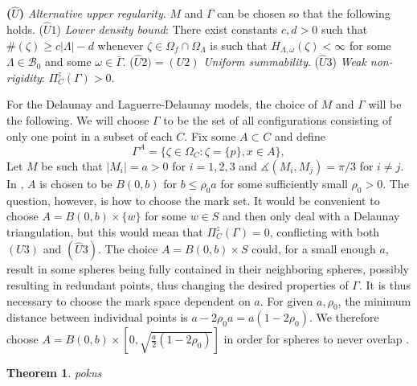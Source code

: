 \documentclass[12pt,a4paper]{report}
\newtheorem{theorem}{Theorem}
\begin{document}

\textbf{($\hat U$)} \textit{Alternative upper regularity}. $M$ and $\Gamma$ can be chosen so that the following holds.\newline
($\hat U 1$) \textit{Lower density bound}: There exist constants $c,d > 0$ such that $\#(\zeta) \geq c|\Lambda| - d$ whenever $\zeta \in \Omega_f\cap \Omega_\Lambda$ is such that $H_{\Lambda,\omega}(\zeta)<\infty$ for some $\Lambda \in \mathcal B_0$ and some $\omega \in \bar\Gamma$.\newline
($\hat U 2 ) = (U2)$ \textit{Uniform summability}.\newline
($\hat U 3$) \textit{Weak non-rigidity}: $\Pi^z_C(\Gamma) > 0$.


For the Delaunay and Laguerre-Delaunay models, the choice of $M$ and $\Gamma$ will be the following. We will choose $\Gamma$ to be the set of all configurations consisting of only one point in a subset of each $C$. Fix some $A \subset C$ and define
$$\Gamma^A = \{\zeta \in \Omega_C: \zeta = \{p\}, x \in A\},$$
Let $M$ be such that $|M_i| = a > 0$ for $i=1,2,3$ and $\measuredangle(M_i,M_j) = \pi / 3$ for $i\neq j$. 
In \cite{DDG}, $A$ is chosen to be $B(0,b)$ for $b\leq \rho_0 a$ for some sufficiently small $\rho_0 >0$. The question, however, is how to choose the mark set. It would be convenient to choose $A=B(0,b)\times\{w\}$ for some $w\in S$ and then only deal with a Delaunay triangulation, but this would mean that $\Pi^z_C(\Gamma) = 0$, conflicting with both $(U3)$ and $(\hat U3)$. The choice $A=B(0,b)\times S$ could, for a small enough $a$, result in some spheres being fully contained in their neighboring spheres, possibly resulting in redundant points, thus changing the desired properties of $\Gamma$. It is thus necessary to choose the mark space dependent on $a$. For given $a,\rho_0$, the minimum distance between individual points is $a-2\rho_0 a = a(1-2\rho_0)$. We therefore choose $A = B(0,b)\times [0, \sqrt{\frac a2(1-2\rho_0)}]$ in order for spheres to never overlap .  







\cite{lamport94}




\begin{theorem}
	pokus
\end{theorem}



\listoftodos
\end{document}
